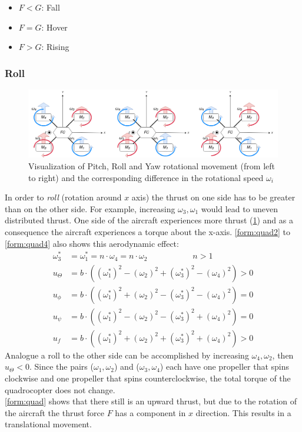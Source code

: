 \begin{itemize}
	\item $F < G$: Fall
	\item $F = G$: Hover
	\item $F > G$: Rising 
\end{itemize}

\newpage

\subsubsection{Roll}
\begin{figure}
	\centering
	\includegraphics[width=\linewidth]{figures/move.png}
	\caption{Visualization of Pitch, Roll and Yaw rotational movement (from left to right) and the corresponding difference in the rotational speed $\omega_i$}
	\label{fig:move}
\end{figure}
In order to \emph{roll} (rotation around $x$ axis) the thrust on one side has to be greater than on the other side. For example,
increasing $\omega_3, \omega_1$ would lead to uneven distributed thrust. 
One side of the aircraft experiences more thrust (\cref{fig:move}) and as a consequence the aircraft experiences a torque about the x-axis.
\cref{form:quad2} to \cref{form:quad4} also shows this aerodynamic effect:
\begin{align*}
	\omega_3^* &= \omega_1^* = n \cdot \omega_4 = n \cdot \omega_2 \qquad \qquad \quad \enspace  n > 1\\
	u_{\Theta} &= b \cdot ((\omega_1^*)^2 - (\omega_2)^2 + (\omega_3^*)^2 - (\omega_4)^2) > 0\\
	u_{\phi} &= b \cdot ((\omega_1^*)^2 + (\omega_2)^2 - (\omega_3^*)^2 - (\omega_4)^2) = 0 \\
	u_{\psi} &= b \cdot ((\omega_1^*)^2 - (\omega_2)^2 - (\omega_3^*)^2 + (\omega_4)^2)	= 0 \\
	u_f &= b \cdot ((\omega_1^*)^2 + (\omega_2)^2 + (\omega_3^*)^2 + (\omega_4)^2) > 0 
\end{align*}
\newline
Analogue a roll to the other side can be accomplished by increasing $\omega_4, \omega_2$, then $u_{\Theta} < 0$. 
Since the pairs ($\omega_1, \omega_2$) and ($\omega_3, \omega_4$) each have one propeller that spins clockwise and one propeller that spins counterclockwise, 
the total torque of the quadrocopter does not change.\\
\cref{form:quad} shows that there still is an upward thrust, but due to the rotation of the aircraft the thrust force $F$ has a component in $x$ direction. 
This results in a translational movement.

